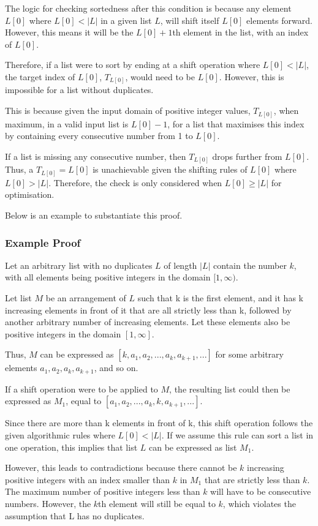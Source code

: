 \documentclass[12pt]{article}
\begin{document}
The logic for checking sortedness after this condition is because any element $L[0]$ where $L[0]<|L|$ in a given list $L$, will shift itself $L[0]$ elements forward. However, this means it will be the $L[0]+1$th element in the list, with an index of $L[0]$.

Therefore, if a list were to sort by ending at a shift operation where $L[0] < |L|$, the target index of $L[0]$, $T_{L[0]}$, would need to be $L[0]$. However, this is impossible for a list without duplicates.

This is because given the input domain of positive integer values, $T_{L[0]}$, when maximum, in a valid input list is $L[0]-1$, for a list that maximises this index by containing every consecutive number from 1 to $L[0]$.

If a list is missing any consecutive number, then $T_{L[0]}$ drops further from $L[0]$. Thus, a $T_{L[0]}=L[0]$ is unachievable given the shifting rules of $L[0]$ where $L[0]>|L|$. Therefore, the check is only considered when $L[0] \geq |L|$ for optimisation.

Below is an example to substantiate this proof.

\subsubsection{Example Proof}
Let an arbitrary list with no duplicates $L$ of length $|L|$ contain the number $k$, with all elements being positive integers in the domain $[1,\infty)$.

Let list $M$ be an arrangement of $L$ such that k is the first element, and it has k increasing elements in front of it that are all strictly less than k, followed by another arbitrary number of increasing elements. Let these elements also be positive integers in the domain $[1,\infty]$.

Thus, $M$ can be expressed as $[k, a_1, a_2, ..., a_k, a_{k+1},...]$ for some arbitrary elements $a_1, a_2, a_k, a_{k+1}$, and so on.

If a shift operation were to be applied to $M$, the resulting list could then be expressed as $M_1$, equal to $[a_1, a_2, ..., a_k, k, a_{k+1}, ...]$.

Since there are more than k elements in front of k, this shift operation follows the given algorithmic rules where $L[0] < |L|$. If we assume this rule can sort a list in one operation, this implies that list $L$ can be expressed as list $M_1$.

However, this leads to contradictions because there cannot be $k$ increasing positive integers with an index smaller than $k$ in $M_1$ that are strictly less than $k$. The maximum number of positive integers less than $k$ will have to be consecutive numbers. However, the $k$th element will still be equal to $k$, which violates the assumption that L has no duplicates.
\end{document}
